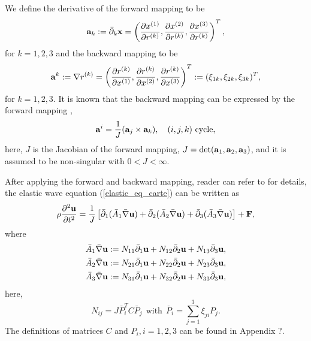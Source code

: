 \documentclass[a4paper]{article}
\begin{document}
We define the derivative of the forward mapping to be 
\begin{equation}\label{elastic_eq_carte}
{\bf a}_k := \bar{\partial}_k{\bf x} = \left(\frac{\partial x^{(1)}}{\partial r^{(k)}},\frac{\partial x^{(2)}}{\partial r^{(k)}},\frac{\partial x^{(3)}}{\partial r^{(k)}}\right)^T,
\end{equation}
for $k = 1,2,3$ and the backward mapping to be
\begin{equation*}
{\bf a}^k := \nabla r^{(k)} = \left(\frac{\partial r^{(k)}}{\partial x^{(1)}},\frac{\partial r^{(k)}}{\partial x^{(2)}},\frac{\partial r^{(k)}}{\partial x^{(3)}}\right)^T := (\xi_{1k},\xi_{2k},\xi_{3k})^T,
\end{equation*}
for $k = 1,2,3$. It is known that the backward mapping can be expressed by the forward mapping \cite{?}, 
\begin{equation*}
{\bf a}^i = \frac{1}{J}({\bf a}_j\times{\bf a}_k), \ \ \ (i,j,k) \ \text{cycle},
\end{equation*}
here, $J$ is the Jacobian of the forward mapping, $J = \text{det}({\bf a}_1, {\bf a}_2, {\bf a}_3)$, and it is assumed to be non-singular with $0<J<\infty$.

After applying the forward and backward mapping, reader can refer to \cite{?} for details, the elastic wave equation (\ref{elastic_eq_carte}) can be written as
\begin{equation}\label{elastic_eq_curvi}
\rho\frac{\partial^2 {\bf u}}{\partial t^2} = \frac{1}{J}\left[\bar{\partial }_1(\bar{A}_1\bar{\nabla}{\bf u}) + \bar{\partial }_2(\bar{A}_2\bar{\nabla}{\bf u}) +\bar{\partial }_3(\bar{A}_3\bar{\nabla}{\bf u}) \right] + {\bf F},
\end{equation}
where
\begin{align*}
	\bar{A}_1\bar{\nabla}{\bf u} &:= N_{11}\bar{\partial}_1{\bf u} + N_{12}\bar{\partial}_2{\bf u} + N_{13}\bar{\partial}_3{\bf u}, \\
	\bar{A}_2\bar{\nabla}{\bf u} &:= N_{21}\bar{\partial}_1{\bf u} + N_{22}\bar{\partial}_2{\bf u} + N_{23}\bar{\partial}_3{\bf u}, \\
	\bar{A}_3\bar{\nabla}{\bf u} &:= N_{31}\bar{\partial}_1{\bf u} + N_{32}\bar{\partial}_2{\bf u} + N_{33}\bar{\partial}_3{\bf u},
\end{align*}
here, 
\begin{equation}\label{definition_Nij}
N_{ij} = J\bar{P}_i^TC\bar{P}_j \ \ \text{with} \ \ \bar{P}_i = \sum_{j=1}^3\xi_{ji}P_j.
\end{equation}
The definitions of matrices $C$ and $P_i, i = 1,2,3$ can be found in Appendix ?. 
\end{document}
